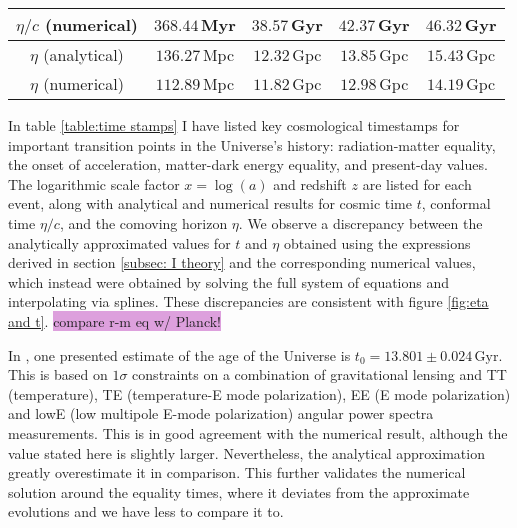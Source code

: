 \documentclass{aa}
\numberwithin{equation}{section}
\numberwithin{table}{section}
\numberwithin{figure}{section}
\begin{document}
\begin{table*}
\begin{tabular}{| c || c | c | c | c |}
     $\eta/c$ (numerical) & \hspace{25pt}$368.44\,$Myr & \hspace{20.5pt}$38.57\,$Gyr & \hspace{19pt}$42.37\,$Gyr & \hspace{25pt}$46.32\,$Gyr \\ 
     \hline 
     \hspace{5.5pt}$\eta$ \hspace{3.5pt}(analytical) & \hspace{25pt}$136.27\,$Mpc & \hspace{20.5pt}$12.32\,$Gpc & \hspace{19pt}$13.85\,$Gpc & \hspace{25pt}$15.43\,$Gpc \\ 
     \hspace{5.5pt}$\eta$ \hspace{3.5pt}(numerical) & \hspace{25pt}$112.89\,$Mpc & \hspace{20.5pt}$11.82\,$Gpc & \hspace{19pt}$12.98\,$Gpc & \hspace{25pt}$14.19\,$Gpc \\ 
  \hline                                   %
  \end{tabular}
  \end{table*}

In table \ref{table:time stamps} I have listed key cosmological timestamps for important transition points in the Universe's history: radiation-matter equality, the onset of acceleration, matter-dark energy equality, and present-day values. The logarithmic scale factor $x = \log (a)$ and redshift $z$ are listed for each event, along with analytical and numerical results for cosmic time $t$, conformal time $\eta/c$, and the comoving horizon $\eta$. We observe a discrepancy between the analytically approximated values for $t$ and $\eta$ obtained using the expressions derived in section \ref{subsec: I theory} and the corresponding numerical values, which instead were obtained by solving the full system of equations and interpolating via splines. These discrepancies are consistent with figure \ref{fig:eta and t}. \colorbox{Plum}{compare r-m eq w/ Planck!}

In \citet{Planck}, one presented estimate of the age of the Universe is $t_0=13.801\pm0.024\,\text{Gyr}$. This is based on $1\sigma$ constraints on a combination of gravitational lensing and TT (temperature), TE (temperature-E mode polarization), EE (E mode polarization) and lowE (low multipole E-mode polarization) angular power spectra measurements. This is in good agreement with the numerical result, although the value stated here is slightly larger. Nevertheless, the analytical approximation greatly overestimate it in comparison. This further validates the numerical solution around the equality times, where it deviates from the approximate evolutions and we have less to compare it to.
\end{document}

